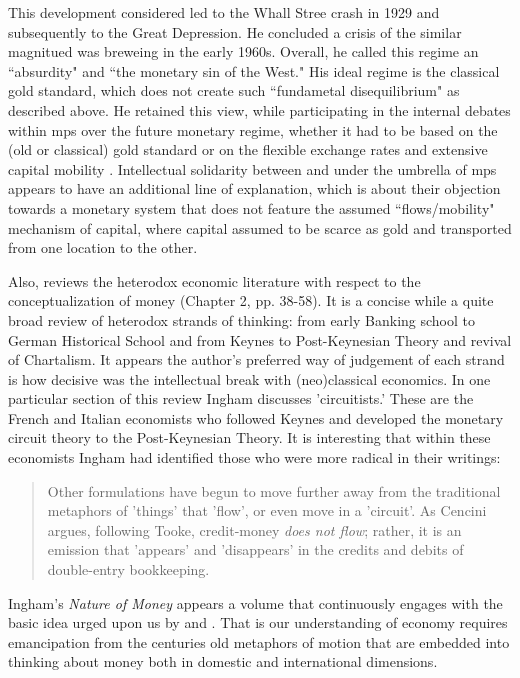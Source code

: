 This development \citeauthor{rueff1972} considered led to the Whall Stree crash in 1929 and subsequently to the Great Depression. He concluded a crisis of the similar magnitued was breweing in the early 1960s. Overall, he called this regime an ``absurdity" and ``the monetary sin of the West." His ideal regime is the classical gold standard, which does not create such ``fundametal disequilibrium" as described above.  He retained this view, while participating in the internal debates within \ac{mps} over the future monetary regime, whether it had to be based on the (old or classical) gold standard or on the flexible exchange rates and extensive capital mobility \citep{schmeltzer2012}. Intellectual solidarity between \citeauthor{rueff1972} and \citeauthor{hayek1937} under the umbrella of \ac{mps} appears to have an additional line of explanation, which is about their objection towards a monetary system that does not feature the assumed ``flows/mobility" mechanism of capital, where capital assumed to be scarce as gold and transported from one location to the other.   

Also, \cite{ingham2004} reviews the heterodox economic literature with respect to the conceptualization of money (Chapter 2, pp. 38-58). It is a concise while a quite broad review of heterodox strands of thinking: from early Banking school to German Historical School and from Keynes to Post-Keynesian Theory and revival of Chartalism. It appears the author's preferred way of judgement of each strand is how decisive was the intellectual break with (neo)classical economics. In one particular section of this review Ingham discusses 'circuitists.' These are the French and Italian economists who followed Keynes and developed the monetary circuit theory to the Post-Keynesian Theory. It is interesting that within these economists Ingham had identified those who were more radical in their writings:

\begin{quote}
Other formulations have begun to move further away from the traditional metaphors of 'things' that 'flow', or even move in a 'circuit'. As Cencini argues, following Tooke, credit-money \textit{does not flow}; rather, it is an emission that 'appears' and 'disappears' in the credits and debits of double-entry bookkeeping. \citep[p.~54, emphasis added]{ingham2004}
\end{quote}

Ingham's \textit{Nature of Money} appears a volume that continuously engages with the basic idea urged upon us by \cite{woodruff2005} and \citep{mosler2022,mosler2023}. That is our understanding of economy requires emancipation from the centuries old metaphors of motion that are embedded into thinking about money both in domestic and international dimensions. 

